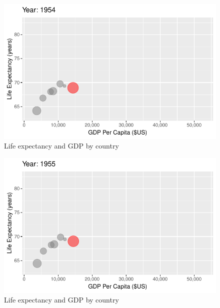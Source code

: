 \documentclass[
  letterpaper,
  DIV=11,
  numbers=noendperiod]{scrreport}
\theoremstyle{definition}
\theoremstyle{remark}
\begin{document}
\begin{figure}

{\centering \includegraphics{index_files/figure-pdf/fig-anim-country-5.pdf}

}

\caption{\label{fig-anim-country-5}Life expectancy and GDP by country}

\end{figure}

\begin{figure}

{\centering \includegraphics{index_files/figure-pdf/fig-anim-country-6.pdf}

}

\caption{\label{fig-anim-country-6}Life expectancy and GDP by country}

\end{figure}
\end{document}

